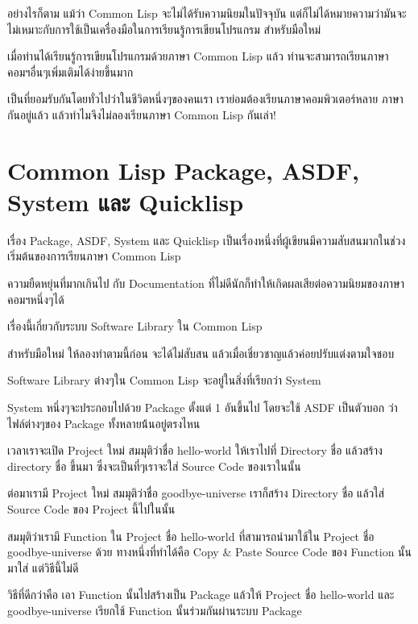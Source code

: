 \documentclass[a4paper]{article}
\begin{document}
อย่างไรก็ตาม แม้ว่า Common Lisp จะไม่ได้รับความนิยมในปัจจุบัน
แต่ก็ไม่ได้หมายความว่ามันจะไม่เหมาะกับการใช้เป็นเครื่องมือในการเรียนรู้การเขียนโปรแกรม%
สำหรับมือใหม่

เมื่อท่านได้เรียนรู้การเขียนโปรแกรมด้วยภาษา Common Lisp แล้ว ท่านจะสามารถเรียนภาษา%
คอมฯอื่นๆเพิ่มเติมได้ง่ายขึ้นมาก

เป็นที่ยอมรับกันโดยทั่วไปว่าในชีวิตหนึ่งๆของคนเรา เราย่อมต้องเรียนภาษาคอมพิวเตอร์หลาย%
ภาษากันอยู่แล้ว แล้วทำไมจึงไม่ลองเรียนภาษา Common Lisp กันเล่า!


\section{Common Lisp Package, ASDF, System และ Quicklisp}

เรื่อง Package, ASDF, System และ Quicklisp
เป็นเรื่องหนึ่งที่ผู้เขียนมีความสับสนมากในช่วงเริ่มต้นของการเรียนภาษา Common Lisp

ความยืดหยุ่นที่มากเกินไป กับ Documentation ที่ไม่ดีนักก็ทำให้เกิดผลเสียต่อความนิยมของภาษา%
คอมฯหนึ่งๆได้

เรื่องนี้เกี่ยวกับระบบ Software Library ใน Common Lisp

สำหรับมือใหม่ ให้ลองทำตามนี้ก่อน จะได้ไม่สับสน แล้วเมื่อเชี่ยวชาญแล้วค่อยปรับแต่งตามใจชอบ

Software Library ต่างๆใน Common Lisp จะอยู่ในสิ่งที่เรียกว่า System

System หนึ่งๆจะประกอบไปด้วย Package ตั้งแต่ 1 อันขึ้นไป โดยจะใช้ ASDF เป็นตัวบอก%
ว่าไฟล์ต่างๆของ Package ทั้งหลายน้้นอยู่ตรงไหน


เวลาเราจะเปิด Project ใหม่ สมมุติว่าชื่อ hello-world ให้เราไปที่ Directory ชื่อ
 แล้วสร้าง directory ชื่อ  ขึ้นมา
ซึ่งจะเป็นที่ๆเราจะใส่ Source Code ของเราในนั้น

ต่อมาเรามี Project ใหม่ สมมุติว่าชื่อ goodbye-universe เราก็สร้าง Directory ชื่อ
 แล้วใส่ Source Code ของ Project
นี้ไปในนั้น

สมมุติว่าเรามี Function ใน Project ชื่อ hello-world ที่สามารถนำมาใช้ใน Project ชื่อ
goodbye-universe ด้วย ทางหนึ่งที่ทำได้คือ Copy \& Paste Source Code ของ
Function นั้นมาใส่ แต่วิธีนี้ไม่ดี

วิธีที่ดีกว่าคือ เอา Function นั้นไปสร้างเป็น Package แล้วให้ Project ชื่อ
hello-world และ goodbye-universe เรียกใช้ Function นั้นร่วมกันผ่านระบบ Package
\end{document}
